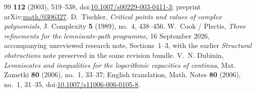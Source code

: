 \documentclass[11pt]{article}
\begin{document}
\begin{thebibliography}{99}
  \textbf{112} (2003), 519--538,
  doi:\href{https://doi.org/10.1007/s00229-003-0411-3}{10.1007/s00229-003-0411-3};
  preprint arXiv:\href{https://arxiv.org/abs/math/0306327}{math/0306327}.
 D.~Tischler,
  \emph{Critical points and values of complex polynomials},
  J. Complexity \textbf{5} (1989), no.~4, 438--456.
 W.~Cook / Plectis,
  \emph{Three refinements for the lemniscate-path programme}, 16 September 2026,
  accompanying unreviewed research note, Sections~1--3, with the earlier
  \emph{Structural obstructions} note preserved in the same revision bundle.
 V.~N. Dubinin,
  \emph{Lemniscates and inequalities for the logarithmic capacities of
  continua}, Mat. Zametki \textbf{80} (2006), no.~1, 33--37;
  English translation, Math. Notes \textbf{80} (2006), no.~1, 31--35,
  doi:\href{https://doi.org/10.1007/s11006-006-0105-8}{10.1007/s11006-006-0105-8}.
\end{thebibliography}

\companionpapercontext
\end{document}
